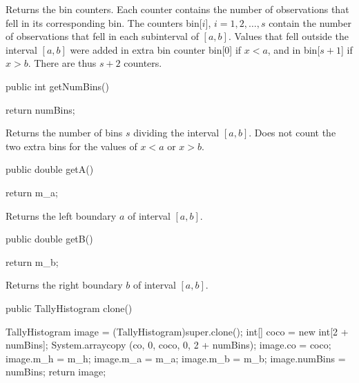 \begin{tabb} Returns the bin counters. Each counter contains the number of
observations that fell in its corresponding bin.
The counters bin[$i$], $i=1, 2, \ldots, s$ contain the number of observations
that fell in each subinterval of $[a,b]$. Values that fell outside the interval
$[a,b]$ were added in extra bin counter bin[0] if $x < a$, and in bin[$s+1$]
if $x > b$. There are thus $s+2$ counters.
\end{tabb}
\begin{htmlonly}
\end{htmlonly}
\begin{code}

   public int getNumBins() \begin{hide} {
      return numBins;
   }\end{hide}
\end{code}
\begin{tabb} Returns the number of bins $s$ dividing the interval $[a,b]$. 
Does not count the two extra bins for the values of $x<a$ or $x>b$.
\end{tabb}
\begin{htmlonly}
\end{htmlonly}
\begin{code}

   public double getA() \begin{hide} {
      return m_a;
   }\end{hide}
\end{code}
\begin{tabb}  Returns the left boundary $a$ of interval $[a,b]$.
\end{tabb}
\begin{htmlonly}
\end{htmlonly}
\begin{code}

   public double getB() \begin{hide} {
      return m_b;
   }\end{hide}
\end{code}
\begin{tabb}  Returns the right boundary $b$ of interval $[a,b]$.
\end{tabb}
\begin{htmlonly}
\end{htmlonly}
\begin{code}

   public TallyHistogram clone()\begin{hide} {
      TallyHistogram image = (TallyHistogram)super.clone();
      int[] coco = new int[2 + numBins];
      System.arraycopy (co, 0, coco, 0, 2 + numBins);
      image.co = coco;
      image.m_h = m_h;
      image.m_a = m_a;
      image.m_b = m_b;
      image.numBins = numBins;
      return image;
   }\end{hide}
\end{code}
